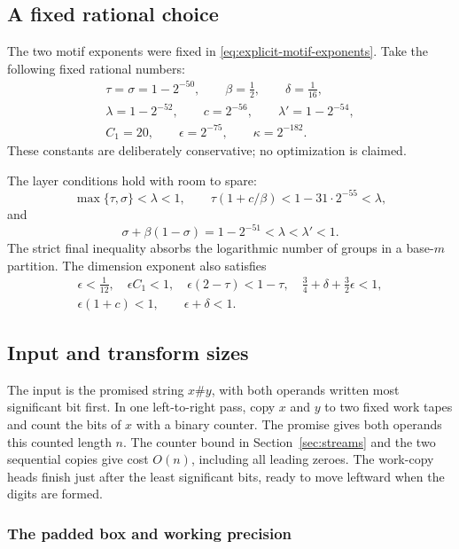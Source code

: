 \documentclass[11pt]{article}
\theoremstyle{definition}
\begin{document}
\subsection{A fixed rational choice}

The two motif exponents were fixed in \eqref{eq:explicit-motif-exponents}.
Take the following fixed rational numbers:
\begin{equation}\label{eq:fixed-parameters}
\begin{gathered}
 \tau=\sigma=1-2^{-50},\qquad \beta=\frac12,\qquad \delta=\frac1{16},\\
 \lambda=1-2^{-52},\qquad c=2^{-56},\qquad
 \lambda'=1-2^{-54},\\
 C_1=20,\qquad \epsilon=2^{-75},\qquad \kappa=2^{-182}.
\end{gathered}
\end{equation}
These constants are deliberately conservative; no optimization is claimed.

The layer conditions hold with room to spare:
\[
 \max\{\tau,\sigma\}<\lambda<1,\qquad
 \tau(1+c/\beta)<1-31\cdot2^{-55}<\lambda,
\]
and
\[
 \sigma+\beta(1-\sigma)=1-2^{-51}<\lambda<\lambda'<1.
\]
The strict final inequality absorbs the logarithmic number of groups in
a base-$m$ partition.  The dimension exponent also satisfies
\[
\begin{gathered}
 \epsilon<\frac1{12},\quad \epsilon C_1<1,\quad
 \epsilon(2-\tau)<1-\tau,\quad
 \frac34+\delta+\frac32\epsilon<1,\\
 \epsilon(1+c)<1,\qquad \epsilon+\delta<1.
\end{gathered}
\]

\subsection{Input and transform sizes}

The input is the promised string $x\#y$, with both operands written
most significant bit first.  In one left-to-right pass, copy $x$ and
$y$ to two fixed work tapes and count the bits of $x$ with a binary
counter.  The promise gives both operands this counted length $n$.
The counter bound in Section~\ref{sec:streams} and the two sequential
copies give cost $O(n)$, including all leading zeroes.  The work-copy
heads finish just after the least significant bits, ready to move
leftward when the digits are formed.

\subsubsection{The padded box and working precision}
\end{document}
